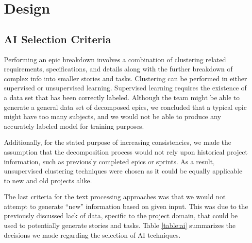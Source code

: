 \section{Design}
\label{design}

\subsection{AI Selection Criteria}
\label{subsection:criteria}
Performing an epic breakdown involves a combination of clustering related requirements, specifications, and details along with the further breakdown of complex info into smaller stories and tasks. Clustering can be performed in either supervised or unsupervised learning. Supervised learning requires the existence of a data set that has been correctly labeled. Although the team might be able to generate a general data set of decomposed epics, we concluded that a typical epic might have too many subjects, and we would not be able to produce any accurately labeled model for training purposes. 

Additionally, for the stated purpose of increasing consistencies, we made the assumption that the decomposition process would not rely upon historical project information, such as previously completed epics or sprints. As a result, unsupervised clustering techniques were chosen as it could be equally applicable to new and old projects alike.

The last criteria for the text processing approaches was that we would not attempt to generate ``new'' information based on given input. This was due to the previously discussed lack of data, specific to the project domain, that could be used to potentially generate stories and tasks. Table \ref{table:ai} summarizes the decisions we made regarding the selection of AI techniques.

